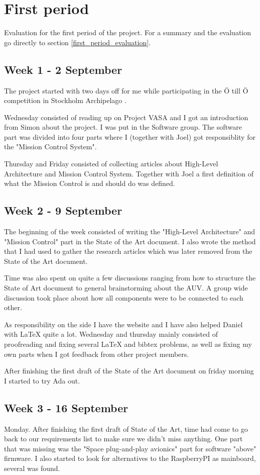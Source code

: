 \section{First period}\label{first_period}
Evaluation for the first period of the project. For a summary and the
evaluation go directly to section \ref{first_period_evaluation}.

\subsection{Week 1 - 2 September}\label{week_1}
The project started with two days off for me while participating in the \"{O}
till \"{O} competition in Stockholm Archipelago \cite{web:otillo}.

Wednesday consisted of reading up on Project VASA and I got an introduction
from Simon about the project. I was put in the Software group. The software
part was divided into four parts where I (together with Joel) got responsiblity
for the "Mission Control System".

Thursday and Friday consisted of collecting articles about High-Level
Architecture and Mission Control System. Together with Joel a first definition
of what the Mission Control is and should do was defined.
\subsection{Week 2 - 9 September}\label{week_2}
The beginning of the week consisted of writing the "High-Level Architecture"
and "Mission Control" part in the State of the Art document. I also wrote
the method that I had used to gather the research articles which was later
removed from the State of the Art document.

Time was also spent on quite a few discussions ranging from how to structure
the State of Art document to general brainstorming about the AUV. A group wide
discussion took place about how all components were to be connected to
each other.

As responsibility on the side I have the website and I have also helped Daniel
with LaTeX quite a lot. Wednesday and thursday mainly consisted of proofreading
and fixing several LaTeX and bibtex problems, as well as fixing my own parts
when I got feedback from other project members.

After finishing the first draft of the State of the Art document on friday
morning I started to try Ada out.

\subsection{Week 3 - 16 September}\label{week_3}
Monday. After finishing the first draft of State of the Art, time
had come to go back to our requirements list to make sure we didn't miss
anything. One part that was missing was the "Space plug-and-play avionics"
part for software "above" firmware. I also started to look for alternatives
to the RaspberryPI as mainboard, several was found.

